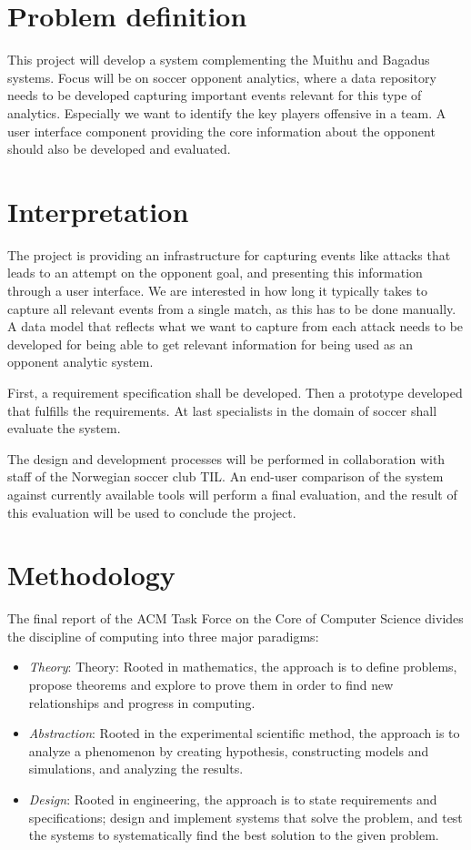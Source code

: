 \section{Problem definition}

This project will develop a system complementing the Muithu and Bagadus systems. Focus will be on soccer opponent analytics, where a data repository needs to be developed capturing important events relevant for this type of analytics. Especially we want to identify the key players offensive in a team. A user interface component providing the core information about the opponent should also be developed and evaluated.

\section{Interpretation}

The project is providing an infrastructure for capturing events like attacks that leads to an attempt on the opponent goal, and presenting this information through a user interface. We are interested in how long it typically takes to capture all relevant events from a single match, as this has to be done manually. A data model that reflects what we want to capture from each attack needs to be developed for being able to get relevant information for being used as an opponent analytic system.

First, a requirement specification shall be developed. Then a prototype developed that fulfills the requirements. At last specialists in the domain of soccer shall evaluate the system.

The design and development processes will be performed in collaboration with staff of the Norwegian soccer club \ac{TIL}. An end-user comparison of the system against currently available tools will perform a final evaluation, and the result of this evaluation will be used to conclude the project.

\section{Methodology}

The final report of the ACM Task Force on the Core of Computer Science \cite{computing_as_a_discipline} divides the discipline of computing into three major paradigms:

\begin{itemize}
\item \emph{Theory}: 
Theory: Rooted in mathematics, the approach is to define problems, propose theorems and explore to prove them in order to find new relationships and progress in computing.
\item \emph{Abstraction}: 
Rooted in the experimental scientific method, the approach is to analyze a phenomenon by creating hypothesis, constructing models and simulations, and analyzing the results.
\item \emph{Design}: 
Rooted in engineering, the approach is to state requirements and specifications; design and implement systems that solve the problem, and test the systems to systematically find the best solution to the given problem.

\end{itemize}

